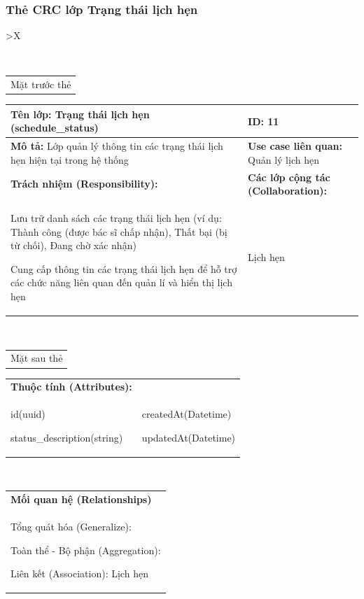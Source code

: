 \subsubsection{Thẻ CRC lớp Trạng thái lịch hẹn}

\begin{xltabular}{\textwidth}{
		>{\centering\arraybackslash}X
	}
	\caption{\bfseries \fontsize{12pt}{0pt}\selectfont Thẻ CRC lớp Trạng thái lịch hẹn}
	\\
	\begin{tabularx}{0.9\textwidth}{X}
		Mặt trước thẻ
	\end{tabularx}
	\begin{tabularx}{0.9\textwidth}{|X|X|}
		\hline
		\textbf{Tên lớp:} Trạng thái lịch hẹn (schedule\_status)                              & \textbf{ID:} 11                                \\
		\hline
		\textbf{Mô tả:} Lớp quản lý thông tin các trạng thái lịch hẹn hiện tại trong hệ thống & \textbf{Use case liên quan:}  Quản lý lịch hẹn \\
		\hline
		\textbf{Trách nhiệm (Responsibility):}                                                & \textbf{Các lớp cộng tác (Collaboration):}     \\
		Lưu trữ danh sách các trạng thái lịch hẹn (ví dụ: Thành công (được bác sĩ chấp nhận), Thất bại (bị từ chối), Đang chờ xác nhận)

		Cung cấp thông tin các trạng thái lịch hẹn để hỗ trợ các chức năng liên quan đến quản lí và hiển thị lịch hẹn
		                                                                                      &
		Lịch hẹn
		\\
		\hline
	\end{tabularx}
	\\
	\begin{tabularx}{0.9\textwidth}{X}
		Mặt sau thẻ
	\end{tabularx}
	\begin{tabularx}{0.9\textwidth}{|X|X|}
		\hline
		\textbf{Thuộc tính (Attributes):} & \\
		id(uuid)

		status\_description(string)
		                                  &
		createdAt(Datetime)

		updatedAt(Datetime)
		\\ \hline
	\end{tabularx}
	\\
	\begin{tabularx}{0.9\textwidth}{|X|}
		\hline
		\textbf{Mối quan hệ (Relationships)} \\
		Tổng quát hóa (Generalize):

		Toàn thể - Bộ phận (Aggregation):

		Liên kết (Association): Lịch hẹn
		\\
		\hline
	\end{tabularx}
\end{xltabular}

